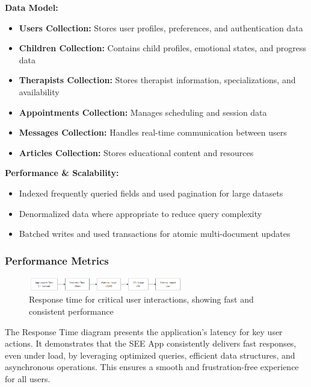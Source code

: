 \documentclass[12pt,a4paper]{article}
\newcommand{\subsectiontitle}[1]{\subsubsection{#1}}
\begin{document}
\begin{minipage}{\linewidth}
\textbf{Data Model:}
\begin{itemize}
    \item \textbf{Users Collection:} Stores user profiles, preferences, and authentication data
    \item \textbf{Children Collection:} Contains child profiles, emotional states, and progress data
    \item \textbf{Therapists Collection:} Stores therapist information, specializations, and availability
    \item \textbf{Appointments Collection:} Manages scheduling and session data
    \item \textbf{Messages Collection:} Handles real-time communication between users
    \item \textbf{Articles Collection:} Stores educational content and resources
\end{itemize}
\end{minipage}

\vspace{1em}

\begin{minipage}{\linewidth}
\textbf{Performance \& Scalability:}
\begin{itemize}
    \item Indexed frequently queried fields and used pagination for large datasets
    \item Denormalized data where appropriate to reduce query complexity
    \item Batched writes and used transactions for atomic multi-document updates
\end{itemize}
\end{minipage}

\subsectiontitle{Performance Metrics}

\begin{figure}[H]
    \centering
    \includegraphics[width=0.6\textwidth,height=0.19\textwidth,keepaspectratio]{redrawn_diagrams/Figure9_Response_Time.png}
    \caption{Response time for critical user interactions, showing fast and consistent performance}
    \label{fig:performance-metrics}
\end{figure}
\vspace{0.5em}
The Response Time diagram presents the application's latency for key user actions. It demonstrates that the SEE App consistently delivers fast responses, even under load, by leveraging optimized queries, efficient data structures, and asynchronous operations. This ensures a smooth and frustration-free experience for all users.
\end{document}
